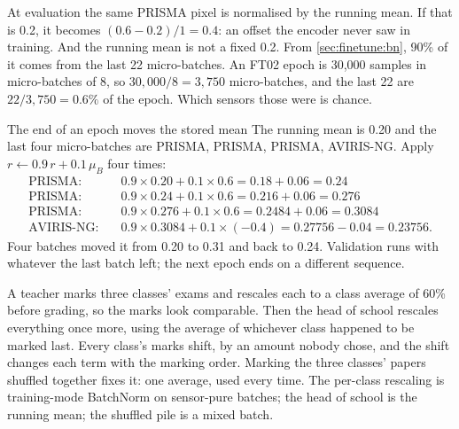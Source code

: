 At evaluation the same PRISMA pixel is normalised by the running mean. If that is 0.2, it becomes $(0.6 - 0.2)/1 = 0.4$: an offset the encoder never saw in
training. And the running mean is not a fixed 0.2. From \cref{sec:finetune:bn}, 90\% of it comes from the last 22 micro-batches. An FT02 epoch is 30,000
samples in micro-batches of 8, so $30{,}000 / 8 = 3{,}750$ micro-batches, and the last 22 are $22 / 3{,}750 = 0.6\%$ of the epoch. Which sensors those were is
chance.

\begin{worked}[label={we:finetune:lastbatches}]{The end of an epoch moves the stored mean}
The running mean is 0.20 and the last four micro-batches are PRISMA, PRISMA, PRISMA, AVIRIS-NG. Apply $r \leftarrow 0.9\,r + 0.1\,\mu_B$ four times:
\begin{align*}
  \text{PRISMA:}&\quad 0.9 \times 0.20 + 0.1 \times 0.6 = 0.18 + 0.06 = 0.24\\
  \text{PRISMA:}&\quad 0.9 \times 0.24 + 0.1 \times 0.6 = 0.216 + 0.06 = 0.276\\
  \text{PRISMA:}&\quad 0.9 \times 0.276 + 0.1 \times 0.6 = 0.2484 + 0.06 = 0.3084\\
  \text{AVIRIS-NG:}&\quad 0.9 \times 0.3084 + 0.1 \times (-0.4) = 0.27756 - 0.04 = 0.23756.
\end{align*}
Four batches moved it from 0.20 to 0.31 and back to 0.24. Validation runs with whatever the last batch left; the next epoch ends on a different sequence.
\end{worked}


\begin{analogy}
A teacher marks three classes' exams and rescales each to a class average of 60\% before grading, so the marks look comparable. Then the head of school
rescales everything once more, using the average of whichever class happened to be marked last. Every class's marks shift, by an amount nobody chose,
and the shift changes each term with the marking order. Marking the three classes' papers shuffled together fixes it: one average, used every time. The
per-class rescaling is training-mode BatchNorm on sensor-pure batches; the head of school is the running mean; the shuffled pile is a mixed batch.
\end{analogy}

